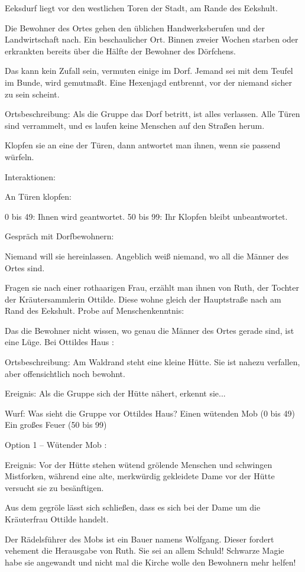 Eeksdurf liegt vor den westlichen Toren der Stadt, am Rande des Eekshult.

Die Bewohner des Ortes gehen den üblichen Handwerksberufen und der Landwirtschaft nach. Ein beschaulicher Ort. Binnen zweier Wochen starben oder erkrankten bereits über die Hälfte der Bewohner des Dörfchens.

Das kann kein Zufall sein, vermuten einige im Dorf. Jemand sei mit dem Teufel im Bunde, wird gemutmaßt. Eine Hexenjagd entbrennt, vor der niemand sicher zu sein scheint.

Ortsbeschreibung: Als die Gruppe das Dorf betritt, ist alles verlassen. Alle Türen sind verrammelt, und es laufen keine Menschen auf den Straßen herum.

Klopfen sie an eine der Türen, dann antwortet man ihnen, wenn sie passend würfeln.

Interaktionen:

An Türen klopfen:

0 bis 49: Ihnen wird geantwortet.
50 bis 99: Ihr Klopfen bleibt unbeantwortet.

Gespräch mit Dorfbewohnern:

Niemand will sie hereinlassen.
Angeblich weiß niemand, wo all die Männer des Ortes sind.

Fragen sie nach einer rothaarigen Frau, erzählt man ihnen von Ruth, der Tochter der Kräutersammlerin Ottilde.
Diese wohne gleich der Hauptstraße nach am Rand des Eekshult.
Probe auf Menschenkenntnis:

Das die Bewohner nicht wissen, wo genau die Männer des Ortes gerade sind, ist eine Lüge.
Bei Ottildes Haus
:

Ortsbeschreibung: Am Waldrand steht eine kleine Hütte. Sie ist nahezu verfallen, aber offensichtlich noch bewohnt.

Ereignis: Als die Gruppe sich der Hütte nähert, erkennt sie...

Wurf: Was sieht die Gruppe vor Ottildes Haus?
Einen wütenden Mob (0 bis 49)
Ein großes Feuer (50 bis 99)

Option 1 – Wütender Mob
:

Ereignis: Vor der Hütte stehen wütend grölende Menschen und schwingen Mistforken, während eine alte, merkwürdig gekleidete Dame vor der Hütte versucht sie zu besänftigen.

Aus dem gegröle lässt sich schließen, dass es sich bei der Dame um die Kräuterfrau Ottilde handelt.

Der Rädelsführer des Mobs ist ein Bauer namens Wolfgang. Dieser fordert vehement die Herausgabe von Ruth. Sie sei an allem Schuld! Schwarze Magie habe sie angewandt und nicht mal die Kirche wolle den Bewohnern mehr helfen!

